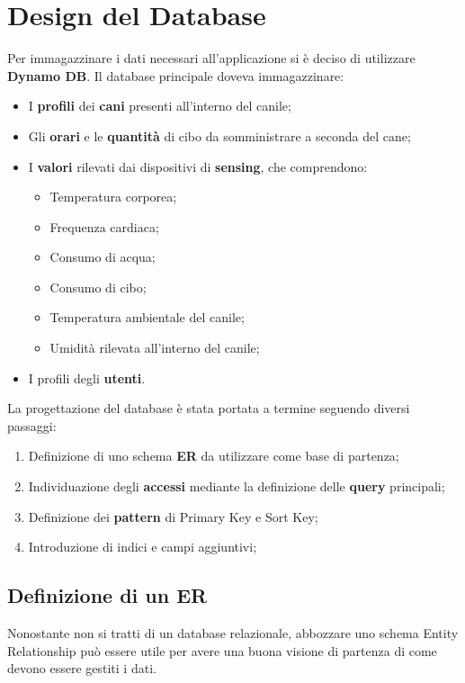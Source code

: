\section{Design del Database}
Per immagazzinare i dati necessari all'applicazione si è deciso di utilizzare \textbf{Dynamo DB}.
Il database principale doveva immagazzinare:
\begin{itemize}
    \item I \textbf{profili} dei \textbf{cani} presenti all'interno del canile;
    \item Gli \textbf{orari} e le \textbf{quantità} di cibo da somministrare a seconda del cane;
    \item I \textbf{valori} rilevati dai dispositivi di \textbf{sensing}, che comprendono:
    \begin{itemize}
        \item Temperatura corporea;
        \item Frequenza cardiaca;
        \item Consumo di acqua; 
        \item Consumo di cibo;
        \item Temperatura ambientale del canile;
        \item Umidità rilevata all'interno del canile;
    \end{itemize}
    \item I profili degli \textbf{utenti}.
\end{itemize}

La progettazione del database è stata portata a termine seguendo diversi passaggi:
    \begin{enumerate}
        \item Definizione di uno schema \textbf{ER} da utilizzare come base di partenza;
        \item Individuazione degli \textbf{accessi} mediante la definizione delle \textbf{query} principali;
        \item Definizione dei \textbf{pattern} di Primary Key e Sort Key;
        \item Introduzione di indici e campi aggiuntivi;
    \end{enumerate}
    
    \subsection{Definizione di un ER}
    Nonostante non si tratti di un database relazionale, abbozzare uno schema Entity Relationship può essere utile per avere una buona visione di partenza di come devono essere gestiti i dati.
